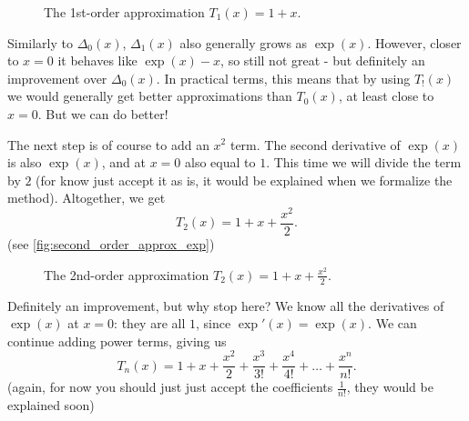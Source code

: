 \begin{figure}
  \centering
  \caption{The 1st-order approximation $T_{1}(x)=1+x$.}
  \label{fig:first_order_approx_exp}
\end{figure}

Similarly to $\Delta_{0}(x)$, $\Delta_{1}(x)$ also generally grows as $\exp(x)$. However, closer to $x=0$ it behaves like $\exp(x)-x$, so still not great - but definitely an improvement over $\Delta_{0}(x)$. In practical terms, this means that by using $T_{!}(x)$ we would generally get better approximations than $T_{0}(x)$, at least close to $x=0$. But we can do better!

The next step is of course to add an $x^{2}$ term. The second derivative of $\exp(x)$ is also $\exp(x)$, and at $x=0$ also equal to $1$. This time we will divide the term by $2$ (for know just accept it as is, it would be explained when we formalize the method). Altogether, we get
\begin{equation}
  T_{2}(x) = 1 + x + \frac{x^{2}}{2}.
  \label{eq:second_order_approx_exp}
\end{equation}
(see \autoref{fig:second_order_approx_exp})

\begin{figure}
  \centering
  \caption{The 2nd-order approximation $T_{2}(x)=1+x+\frac{x^{2}}{2}$.}
  \label{fig:second_order_approx_exp}
\end{figure}

Definitely an improvement, but why stop here? We know all the derivatives of $\exp(x)$ at $x=0$: they are all $1$, since $\exp'(x)=\exp(x)$. We can continue adding power terms, giving us
\begin{equation}
  T_{n}(x) = 1 + x + \frac{x^{2}}{2} + \frac{x^{3}}{3!} + \frac{x^{4}}{4!} + \dots + \frac{x^{n}}{n!}.
  \label{eq:n_order_approx_exp}
\end{equation}
(again, for now you should just just accept the coefficients $\frac{1}{n!}$, they would be explained soon)
